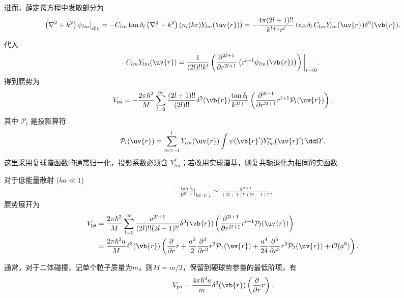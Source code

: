 进而，薛定谔方程中发散部分为
\begin{align*}
	\left( \nabla^{2} + k^{2} \right) \psi_{lm} \big|_{\mathrm{div}} = -C_{lm} \tan\delta_{l} \left( \nabla^{2} + k^{2} \right) \left( n_{l}(kr) Y_{lm}(\uv{r}) \right) = -\frac{4\pi (2l+1)!!}{k^{l+1} r^{l}} \tan\delta_{l}\, C_{lm} Y_{lm}(\uv{r}) \delta^3(\vb{r}).
\end{align*}

代入
\begin{align*}
	C_{lm} Y_{lm}(\uv{r}) = \frac{1}{(2l)!! k^{l}} \left( \frac{\partial^{2l+1}}{\partial r^{2l+1}} \left( r^{l+1} \psi_{lm}(\vb{r}) \right) \right) \bigg|_{r \to 0}.
\end{align*}
得到赝势为
\begin{align*}
	V_{\mathrm{ps}} = -\frac{2\pi \hbar^{2}}{M} \sum_{l=0}^{\infty} \frac{(2l+1)!!}{(2l)!!} \delta^3(\vb{r}) \frac{\tan\delta_{l}}{k^{2l+1}} \left( \frac{\partial^{2l+1}}{\partial r^{2l+1}} r^{l+1} \mathcal{P}_{l}(\uv{r}) \right).
\end{align*}
其中 \(\mathcal{P}_{l}\) 是投影算符
\begin{align*}
	\mathcal{P}_{l}(\uv{r}) = \sum_{m=-l}^{l} Y_{lm}(\uv{r}) \int \psi(\vb{r}') Y_{lm}^{*}(\uv{r}') \, \dd \Omega'.
\end{align*}
这里采用复球谐函数的通常归一化，投影系数必须含 \(Y_{lm}^{*}\)；若改用实球谐基，则复共轭退化为相同的实函数.

对于低能量散射 (\(ka \ll 1\))
\begin{align*}
	-\frac{\tan\delta_{l}}{k^{2l+1}} \bigg|_{ka \ll 1} \simeq \frac{a^{2l+1}}{(2l+1)!!(2l-1)!!}.
\end{align*}
赝势展开为
\begin{align*}
	V_{\mathrm{ps}} &= \frac{2\pi \hbar^{2}}{M} \sum_{l=0}^{\infty} \frac{a^{2l+1}}{(2l)!!(2l-1)!!} \delta^3(\vb{r}) \left( \frac{\partial^{2l+1}}{\partial r^{2l+1}} r^{l+1} \mathcal{P}_{l}(\uv{r}) \right)\\&= \frac{2\pi \hbar^{2} a}{M} \delta^3(\vb{r}) \left( \frac{\partial}{\partial r} r + \frac{a^{2}}{2} \frac{\partial^{3}}{\partial r^{3}} r^{2} \mathcal{P}_{1}(\uv{r}) + \frac{a^{4}}{24} \frac{\partial^{5}}{\partial r^{5}} r^{3} \mathcal{P}_{2}(\uv{r}) + \mathcal{O}(a^{6}) \right).
\end{align*}

通常，对于二体碰撞，记单个粒子质量为\(m\)，则\(M = m/2\)，保留到硬球势参量的最低阶项，有
\begin{align*}
	V_{\mathrm{ps}} = \frac{4\pi \hbar^{2} a}{m} \delta^3(\vb{r}) \left( \frac{\partial}{\partial r} r \right).
\end{align*}

